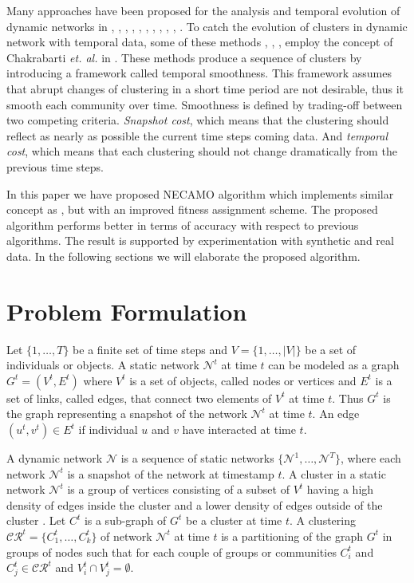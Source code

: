 \documentclass[12pt]{arsubmit}
\begin{document}
Many approaches have been proposed for the analysis and temporal evolution of dynamic networks in \cite{dynmoga1}, \cite{dynmoga3}, \cite{dynmoga12}, \cite{dynmoga13}, \cite{dynmoga14}, \cite{dynmoga15}, \cite{dynmoga21}, \cite{dynmoga23}, \cite{dynmoga24}, \cite{dynmoga25}, \cite{dynmoga26}. To catch the evolution of clusters in dynamic network with temporal data, some of these methods \cite{dynmoga3}, \cite{dynmoga12}, \cite{dynmoga15}, \cite{dynmoga24} employ the concept of Chakrabarti \emph{et. al.} in \cite{chakrabarti}. These methods produce a sequence of clusters by introducing a framework called temporal smoothness. This framework assumes that abrupt changes of clustering in a short time period are not desirable, thus it smooth each community over time. Smoothness is defined by trading-off between two competing criteria. \emph{Snapshot cost}, which means that the clustering should reflect as nearly as possible the current time steps coming data.  And \emph{temporal cost}, which means that each clustering should not change dramatically from the previous time steps.

In this paper we have proposed NECAMO algorithm which implements similar concept as \cite{spea2}, but with an improved fitness assignment scheme. The proposed algorithm performs better in terms of accuracy with respect to previous algorithms. The result is supported by experimentation with synthetic and real data. In the following sections we will elaborate the proposed algorithm.


\section{Problem Formulation}


Let  $\{1,\ldots,T\}$ be a finite set of time steps and $V = \{1,\ldots,|V|\}$ be a set of individuals or objects. A static network $\mathcal{N}^t$ at time $t$ can be modeled as a graph $G^t = (V^t,E^t)$ where $V^t$ is a set of objects, called nodes or vertices and $E^t$ is a set of links, called edges, that connect two elements of $V^t$ at time $t$. Thus $G^t$ is the graph representing a snapshot of the network $\mathcal{N}^t$ at time $t$. An edge $(u^t, v^t)\in E^t$ if individual $u$ and $v$ have interacted at time $t$.

A dynamic network $\mathcal{N}$ is a sequence of static networks $\{\mathcal{N}^1,\ldots,\mathcal{N}^T\}$, where each network $\mathcal{N}^t$ is a snapshot of the network at timestamp $t$. A cluster in a static network $\mathcal{N}^t$ is a group of vertices consisting of a subset of $V^t$ having a high density of edges inside the cluster and a lower density of edges outside of the cluster \cite{dynmoga}. Let $C^t$ is a sub-graph of $G^t$ be a cluster at time $t$. A clustering $\mathcal{CR}^t = \{C_1^t,\ldots,C_k^t\}$ of network $\mathcal{N}^t$ at time $t$ is a partitioning of the graph $G^t$ in groups of nodes such that for each couple of groups or communities $C_i^t$ and $C_j^t \in  \mathcal{CR}^t$ and $V_i^t \cap V_j^t = \emptyset$.
\end{document}
